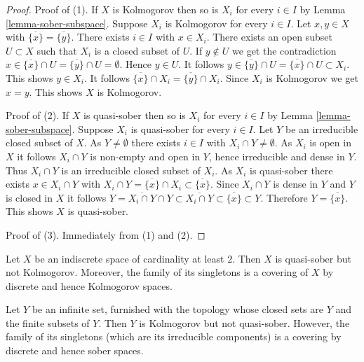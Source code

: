 \begin{proof}
Proof of (1). If $X$ is Kolmogorov then so is $X_i$ for every $i\in I$ by
Lemma \ref{lemma-sober-subspace}. Suppose $X_i$ is Kolmogorov for every
$i\in I$. Let $x,y\in X$ with $\overline{\{x\}}=\overline{\{y\}}$. There exists
$i\in I$ with $x\in X_i$. There exists an open subset $U\subset X$ such that
$X_i$ is a closed subset of $U$. If $y\notin U$ we get the contradiction
$x\in\overline{\{x\}}\cap U=\overline{\{y\}}\cap U=\emptyset$. Hence $y\in U$.
It follows $y\in\overline{\{y\}}\cap U=\overline{\{x\}}\cap U\subset X_i$.
This shows $y\in X_i$. It follows
$\overline{\{x\}}\cap X_i=\overline{\{y\}}\cap X_i$. Since $X_i$ is
Kolmogorov we get $x=y$. This shows $X$ is Kolmogorov.

\medskip\noindent
Proof of (2). If $X$ is quasi-sober then so is $X_i$ for every $i\in I$ by
Lemma \ref{lemma-sober-subspace}. Suppose $X_i$ is quasi-sober for every
$i\in I$. Let $Y$ be an irreducible closed subset of $X$. As $Y\neq\emptyset$
there exists $i\in I$ with $X_i\cap Y\neq\emptyset$. As $X_i$ is open in $X$ it
follows $X_i\cap Y$ is non-empty and open in $Y$, hence irreducible
and dense in $Y$. Thus $X_i\cap Y$ is an irreducible closed subset of $X_i$. As
$X_i$ is quasi-sober there exists $x\in X_i\cap Y$ with
$X_i\cap Y=\overline{\{x\}}\cap X_i\subset\overline{\{x\}}$. Since
$X_i\cap Y$ is dense in $Y$ and $Y$ is closed in $X$ it follows
$Y=\overline{X_i\cap Y}\cap Y\subset\overline{X_i\cap Y}\subset
\overline{\{x\}}\subset Y$. Therefore
$Y=\overline{\{x\}}$. This shows $X$ is quasi-sober.

\medskip\noindent
Proof of (3). Immediately from (1) and (2).
\end{proof}

\begin{example}
\label{example-quasi-sober-not-kolmogorov}
Let $X$ be an indiscrete space of cardinality at least $2$. Then $X$ is
quasi-sober but not Kolmogorov. Moreover, the family of its singletons is a
covering of $X$ by discrete and hence Kolmogorov spaces.
\end{example}

\begin{example}
\label{example-kolmogorov-not-quasi-sober}
Let $Y$ be an infinite set, furnished with the topology whose closed sets are
$Y$ and the finite subsets of $Y$. Then $Y$ is Kolmogorov but not quasi-sober.
However, the family of its singletons (which are its irreducible components) is
a covering by discrete and hence sober spaces.
\end{example}

